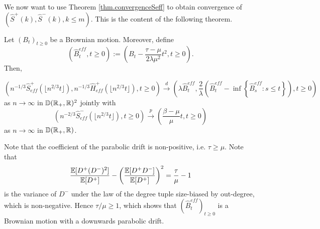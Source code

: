 We now want to use Theorem \ref{thm.convergenceSeff} to obtain convergence of $(\hat{S}^+(k),\hat{S}^-(k), k\leq m)$.  This is the content of the following theorem.
\begin{theorem}\label{thm.convergencetohatBeff}
Let $(B_t)_{t\geq 0}$ be a Brownian motion. Moreover, define
$$(\hat{B}^{eff}_t,t\geq 0):=\left( B_t-\frac{\tau-\mu}{2\lambda \mu^2}t^2, t\geq 0\right).$$ Then,

$$\left(n^{-1/3}\hat{S}^+_{eff}\left(\lfloor n^{2/3}t\rfloor \right),n^{-1/3}\hat{H}^+_{eff}\left(\lfloor n^{2/3}t\rfloor \right), t\geq 0\right)\overset{d}{\to}\left(\lambda \hat{B}^{eff}_t, \frac{2}{\lambda} \left(\hat{B}^{eff}_t-\inf\left\{\hat{B}^{eff}_s: s\leq t\right\}\right), t\geq 0\right)$$
as $n\to \infty$ in ${\mathbb D}({\mathbb R}_+,{\mathbb R})^2$ jointly with 
$$\left(n^{-2/3}\hat{S}^-_{eff}\left(\lfloor n^{2/3}t\rfloor \right), t\geq 0\right)\overset{p}{\to}\left(\frac{\beta-\mu}{\mu}t, t\geq 0\right)$$
as $n\to \infty$ in ${\mathbb D}({\mathbb R}_+,{\mathbb R})$.


\end{theorem}
\begin{remark}
Note that the coefficient of the parabolic drift is non-positive, i.e. $\tau\geq \mu$. Note that 
$$\frac{{\mathbb E}[D^+(D^-)^2]}{{\mathbb E}[D^+]}-\left(\frac{{\mathbb E}[D^+D^-]}{{\mathbb E}[D^+]}\right)^2=\frac{\tau}{\mu}-1$$
is the variance of $D^-$ under the law of the degree tuple size-biased by out-degree, which is non-negative. Hence $\tau/\mu\geq 1$, which shows that $(\hat{B}^{eff}_t)_{t\geq 0}$ is a Brownian motion with a downwards parabolic drift. 
\end{remark}
